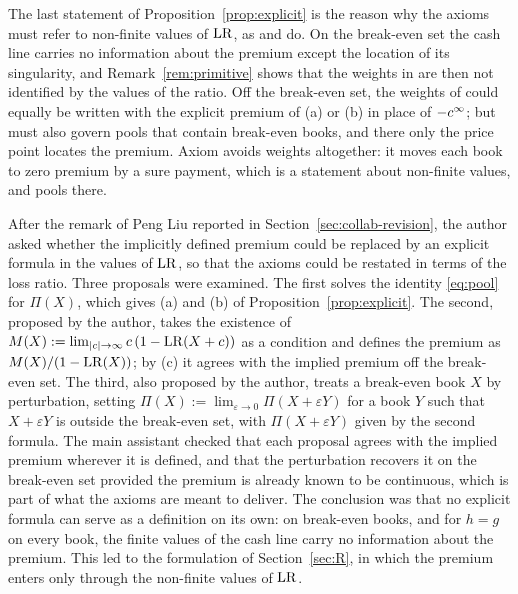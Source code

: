 The last statement of Proposition~\ref{prop:explicit} is the reason why the axioms must refer to non-finite
values of $\mathrm{LR}$, as \axPe{} and \axR{} do. On the break-even set the cash line carries no information about the premium except the
location of its singularity, and Remark~\ref{rem:primitive} shows that the weights in \axCM{} are then not
identified by the values of the ratio. Off the break-even set, the weights of \axCM{} could equally be written with
the explicit premium of (a) or (b) in place of $-c^{\infty}_{}$; but \axCM{} must also govern pools that contain
break-even books, and there only the price point locates the premium. Axiom \axR{} avoids weights altogether: it
moves each book to zero premium by a sure payment, which is a statement about non-finite values, and pools there.

\begin{discussion}
After the remark of Peng Liu reported in Section~\ref{sec:collab-revision}, the author asked whether the implicitly
defined premium could be replaced by an explicit formula in the values of $\mathrm{LR}$, so that the axioms could be
restated in terms of the loss ratio. Three proposals were examined. The first solves the identity \eqref{eq:pool}
for $\Pi(X)$, which gives (a) and (b) of Proposition~\ref{prop:explicit}. The second, proposed by the author, takes
the existence of $M(X):=\lim_{|c|\to\infty}c\,(1-\mathrm{LR}(X+c))$ as a condition and defines the premium as
$M(X)/(1-\mathrm{LR}(X))$; by (c) it agrees with the implied premium off the break-even set. The third, also proposed by
the author, treats a break-even book $X$ by perturbation, setting $\Pi(X):=\lim_{\varepsilon\to0}\Pi(X+\varepsilon
Y)$ for a book $Y$ such that $X+\varepsilon Y$ is outside the break-even set, with $\Pi(X+\varepsilon Y)$ given by
the second formula. The main assistant checked that each proposal agrees with the implied premium wherever it is
defined, and that the perturbation recovers it on the break-even set provided the premium is already known to be
continuous, which is part of what the axioms are meant to deliver. The conclusion was that no explicit formula can
serve as a definition on its own: on break-even books, and for $h=g$ on every book, the finite values of the cash
line carry no information about the premium. This led to the formulation of Section~\ref{sec:R}, in which the
premium enters only through the non-finite values of $\mathrm{LR}$.
\end{discussion}

